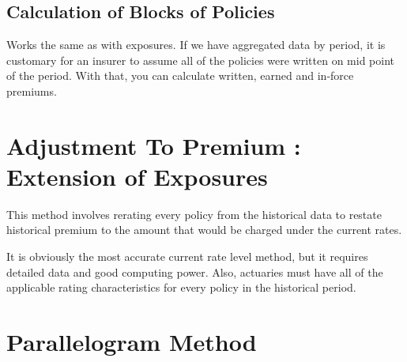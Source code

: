 \documentclass[11pt, english]{memoir}
\numberwithin{definition}{section}
\begin{document}
	\subsection{Calculation of Blocks of Policies}
		Works the same as with exposures. If we have aggregated data by period, it is customary for an insurer to assume all of the policies were written on mid point of the period. With that, you can calculate written, earned and in-force premiums. 


\section{Adjustment To Premium : Extension of Exposures}
	This method involves rerating every policy from the historical data to restate historical premium to the amount that would be charged under the current rates. 

	It is obviously the most accurate current rate level method, but it requires detailed data and good computing power. Also, actuaries must have all of the applicable rating characteristics for every policy in the historical period. 

\section{Parallelogram Method}
	
\end{document}
